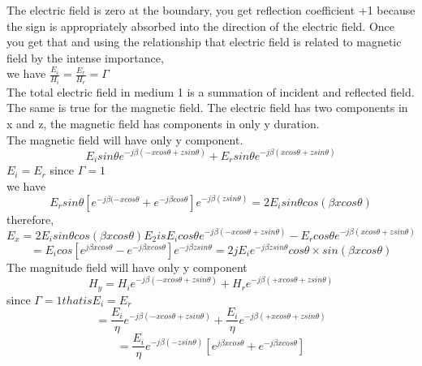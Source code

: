 The electric field is zero at the boundary, you get reflection coefficient +1 because the sign is appropriately absorbed into the direction of the electric field. Once you get that and using the relationship that electric field is related to magnetic field by the intense importance,\\
we have $\frac{E_{i}}{H_{i}} = \frac{E_{r}}{H_{r}} =\Gamma$\\
The total electric field in medium 1 is a summation of incident and reflected field. The same is true for the magnetic field. The electric field has two components in x and z, the magnetic field has components in only y duration.\\
The magnetic field will have only y component.
\begin{equation*}
E_{i}sin\theta e^{-j\beta(-xcos\theta + zsin\theta)} + E_{r}sin\theta e^{-j\beta(xcos\theta + zsin\theta)}
\end{equation*}
$E_{i} =E_{r}$    since $\Gamma =1$\\
we have
\begin{dmath*}
E_{r}sin\theta [e^{-j\beta(-xcos\theta} + e^{-j\beta cos\theta}] e^{-j\beta(zsin\theta)} = 2E_{i}sin\theta cos(\beta xcos\theta)
\end{dmath*}
therefore,
\begin{dmath*}
E_x = 2E_{i}sin\theta cos(\beta xcos\theta)
E_{2} is E_{i}cos\theta e^{-j\beta(-xcos\theta + zsin\theta)} - E_{r}cos\theta e^{-j\beta(xcos\theta + zsin\theta)} 
\end{dmath*}
\begin{dmath*}
= E_{i}cos[e^{j\beta xcos\theta} - e^{-j\beta xcos\theta}]e^{-j\beta zsin\theta}
=2jE_{i}e^{-j\beta zsin\theta} cos\theta \times sin(\beta xcos\theta)
\end{dmath*}
The magnitude field will have only y component\\
\begin{equation*}
H_{y} = H_{i}e^{-j\beta(-xcos\theta + zsin\theta)} + H_{r}e^{-j\beta(+xcos\theta + zsin\theta)}
\end{equation*}
since $\Gamma = 1 that is E_{i}=E_{r}$\\
\begin{equation*}
= \frac{E_{i}}{\eta} e^{-j\beta(-xcos\theta + zsin\theta)} + \frac{E_{i}}{\eta}e^{-j\beta(+xcos\theta + zsin\theta)}
\end{equation*}
\begin{equation*}
=\frac{E_{i}}{\eta} e^{-j\beta(-zsin\theta)} [e^{j\beta xcos\theta} + e^{-j\beta xcos\theta}]
\end{equation*}
